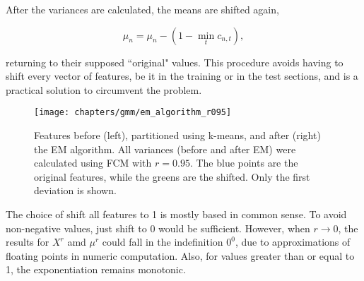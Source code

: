 \noindent After the variances are calculated, the means are shifted again,

\begin{equation}
    \mu_n = \mu_n - (1 - \min_t c_{n,t}),
    \label{eq:means-shift-down}
\end{equation}

\noindent returning to their supposed ``original" values. This procedure avoids having to shift every vector of features, be it in the training or in the test sections, and is a practical solution to circumvent the problem.

\begin{figure}[ht]
    \centering
    \texttt{[image: chapters/gmm/em\_algorithm\_r095]}
    \caption{Features before (left), partitioned using k-means, and after (right) the EM algorithm. All variances (before and after EM) were calculated using FCM with $r = 0.95$. The blue points are the original features, while the greens are the shifted. Only the first deviation is shown.}
    \label{fig:frac-em_algorithm}
\end{figure}

The choice of shift all features to 1 is mostly based in common sense. To avoid non-negative values, just shift to 0 would be sufficient. However, when $r \to 0$, the results for $X^r$ amd $\mu^r$ could fall in the indefinition $0^0$, due to approximations of floating points in numeric computation. Also, for values greater than or equal to 1, the exponentiation remains monotonic.